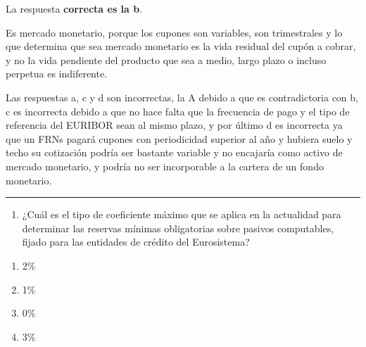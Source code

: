 \documentclass[
  letterpaper,
  DIV=11,
  numbers=noendperiod]{scrreprt}
\providecommand{\tightlist}{%
  \setlength{\itemsep}{0pt}\setlength{\parskip}{0pt}}\usepackage{longtable,booktabs,array}
\begin{document}
\begin{tcolorbox}[enhanced jigsaw, left=2mm, opacityback=0, colback=white, breakable, arc=.35mm, bottomrule=.15mm, rightrule=.15mm, toprule=.15mm, leftrule=.75mm, colframe=quarto-callout-tip-color-frame]
\begin{minipage}[t]{5.5mm}
\textcolor{quarto-callout-tip-color}{\faLightbulb}
\end{minipage}%
\begin{minipage}[t]{\textwidth - 5.5mm}

La respuesta \textbf{correcta es la b}.

Es mercado monetario, porque los cupones son variables, son trimestrales
y lo que determina que sea mercado monetario es la vida residual del
cupón a cobrar, y no la vida pendiente del producto que sea a medio,
largo plazo o incluso perpetua es indiferente.

Las respuestas a, c y d son incorrectas, la A debido a que es
contradictoria con b, c es incorrecta debido a que no hace falta que la
frecuencia de pago y el tipo de referencia del EURIBOR sean al mismo
plazo, y por último d es incorrecta ya que un FRNs pagará cupones con
periodicidad superior al año y hubiera suelo y techo su cotización
podría ser bastante variable y no encajaría como activo de mercado
monetario, y podría no ser incorporable a la cartera de un fondo
monetario.

\end{minipage}%
\end{tcolorbox}

\begin{center}\rule{0.5\linewidth}{0.5pt}\end{center}

\begin{enumerate}
\def\labelenumi{\arabic{enumi}.}
\setcounter{enumi}{33}
\tightlist
\item
  ¿Cuál es el tipo de coeficiente máximo que se aplica en la actualidad
  para determinar las reservas mínimas obligatorias sobre pasivos
  computables, fijado para las entidades de crédito del Eurosistema?
\end{enumerate}

\begin{enumerate}
\def\labelenumi{\alph{enumi})}
\item
  2\%
\item
  1\%
\item
  0\%
\item
  3\%
\end{enumerate}
\end{document}
